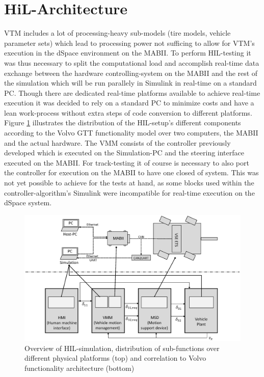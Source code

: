 \documentclass[root.tex]{subfiles}
\begin{document}
{\pagestyle{empty}}
\section{HiL-Architecture}
\label{chap:HiL-Architecture}
\gls{VTM} includes a lot of processing-heavy sub-models (tire models, vehicle parameter sets) which lead to processing power not sufficing to allow for \gls{VTM}'s execution in the dSpace environment on the \gls{MABII}. To perform \gls{HIL}-testing it was thus necessary to split the computational load and accomplish real-time data exchange between the hardware controlling-system on the \gls{MABII} and the rest of the simulation which will be run parallely in Simulink in real-time on a standard PC. Though there are dedicated real-time platforms available to achieve real-time execution it was decided to rely on a standard PC to minimize costs and have a lean work-process without extra steps of code conversion to different platforms. Figure \ref{fig:HIL_overview} illustrates the distribution of the \gls{HIL}-setup's different components according to the Volvo GTT functionality model over two computers, the \gls{MABII} and the actual hardware. The \gls{VMM} consists of the controller previously developed which is executed on the Simulation-PC and the steering interface executed on the \gls{MABII}. For track-testing it of course is necessary to also port the controller for execution on the \gls{MABII} to have one closed of system. This was not yet possible to achieve for the tests at hand, as some blocks used within the controller-algorithm's  Simulink were incompatible for real-time execution on the dSpace system.

\begin{figure}[h]
	\centering
	\includegraphics[width=0.8\linewidth]{HIL_overview}
	\caption[Overview of \acrlong{HIL}-simulation, distribution of sub-functions over different physical platforms (top) and correlation to Volvo functionality architecture (bottom)]{Overview of \gls{HIL}-simulation, distribution of sub-functions over different physical platforms (top) and correlation to Volvo functionality architecture (bottom)}
	
	\label{fig:HIL_overview}
\end{figure}
\end{document}

